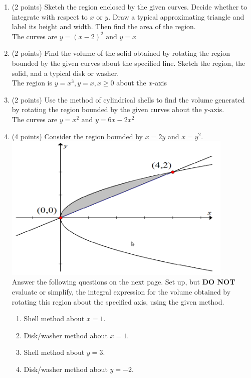 \documentclass[paper=a4, fontsize=11pt]{scrartcl} %
\numberwithin{equation}{section} %
\numberwithin{figure}{section} %
\numberwithin{table}{section} %
\begin{document}
\begin{enumerate}
\setlength{\itemsep}{0.45in}
\item (2 points) Sketch the region enclosed by the given curves.  Decide whether to integrate with respect to $x$ or $y$.  Draw a typical approximating triangle and label its height and width.  Then find the area of the region.\\

The curves are $\displaystyle y=(x-2)^2 \text{ and } y=x$
\vspace{2.5in}

\item (2 points) Find the volume of the solid obtained by rotating the region bounded by the given curves about the specified line.  Sketch the region, the solid, and a typical disk or washer.\\

The region is $\displaystyle y=x^3, y=x, x \ge 0$ about the $x$-axis

\newpage

\item (2 points) Use the method of cylindrical shells to find the volume generated by rotating the region bounded by the given curves about the y-axis.\\

The curves are $\displaystyle y=x^2 \text{ and } y=6x-2x^2$
\vspace{2.5in}

\item (4 points) Consider the region bounded by $x=2y$ and $x=y^2$.\\
\includegraphics[width=11cm]{IC2_4}\\
Answer the following questions on the next page. 
\newpage
Set up, but \textbf{DO NOT} evaluate or simplify, the integral expression for the volume obtained by rotating this region about the specified axis, using the given method.\\
\begin{enumerate}
\item Shell method about $x=1$.
\vspace{1.5in}
\item Disk/washer method about $x=1$.
\vspace{1.5in}
\item Shell method about $y=3$.
\vspace{1.5in}
\item Disk/washer method about $y=-2$.


\end{enumerate}
\end{enumerate}
\end{document}

